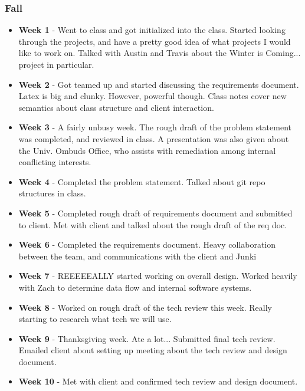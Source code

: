 \documentclass[onecolumn, draftclsnofoot,10pt, compsoc]{IEEEtran}
\begin{document}
			\subsubsection{Fall}
				\begin{itemize}
					\item \textbf{Week 1} - Went to class and got initialized into the class. Started looking through the projects, and have a pretty good idea of what projects I would like to work on.  Talked with Austin and Travis about the Winter is Coming... project in particular.
					\item \textbf{Week 2} - Got teamed up and started discussing the requirements document. Latex is big and clunky.  However, powerful though. Class notes cover new semantics about class structure and client interaction.  
					\item \textbf{Week 3} - A fairly unbusy week. The rough draft of the problem statement was completed, and reviewed in class. A presentation was also given about the Univ. Ombuds Office, who assists with remediation among internal conflicting interests.
					\item \textbf{Week 4} - Completed the problem statement. Talked about git repo structures in class.
					\item \textbf{Week 5} - Completed rough draft of requirements document and submitted to client. Met with client and talked about the rough draft of the req doc.
					\item \textbf{Week 6} - Completed the requirements document. Heavy collaboration between the team, and communications with the client and Junki 
					\item \textbf{Week 7} - REEEEEALLY started working on overall design. Worked heavily with Zach to determine data flow and internal software systems.
					\item \textbf{Week 8} - Worked on rough draft of the tech review this week.  Really starting to research what tech we will use.
					\item \textbf{Week 9} - Thanksgiving week. Ate a lot... Submitted final tech review. Emailed client about setting up meeting about the tech review and design document. 
					\item \textbf{Week 10} - Met with client and confirmed tech review and design document.
				\end{itemize}
\end{document}
